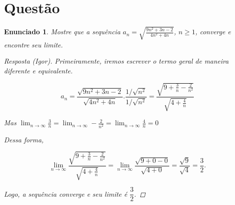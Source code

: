 \documentclass[a4paper,twoside,11pt]{article}
\newtheorem*{enunciado}{Enunciado}
\begin{document}
\section{Questão}
\begin{enunciado}
    Mostre que a sequência $a_n = \sqrt{\frac{9n^2 + 3n - 2}{4n^2+4n}}$, $n \geq 1$, converge e
    encontre seu limite.
    
    \begin{proof}[Resposta (Igor)]
        Primeiramente, iremos escrever o termo geral de maneira diferente e equivalente.

        $$a_n = \dfrac{\sqrt{9n^2+3n-2}}{\sqrt{4n^2+4n}}.\frac{1/\sqrt{n^2}}{1/\sqrt{n^2}}
        = \dfrac{\sqrt{9+\frac{3}{n}-\frac{2}{n^2}}}{\sqrt{4+\frac{4}{n}}}$$

        Mas
        $\lim_{n \rightarrow \infty}\frac{3}{n}
        = \lim_{n \rightarrow \infty}-\frac{2}{n^2}
        = \lim_{n \rightarrow \infty}\frac{4}{n} = 0$

        Dessa forma,
        
        $$\lim_{n \rightarrow \infty}
        \dfrac{\sqrt{9+\frac{3}{n}-\frac{2}{n^2}}}{\sqrt{4+\frac{4}{n}}}
        = \lim_{n \rightarrow \infty} \dfrac{\sqrt{9+0-0}}{\sqrt{4+0}} = \dfrac{\sqrt{9}}{\sqrt{4}} = \dfrac{3}{2}.$$
        
        Logo, a sequência converge e seu limite é $\dfrac{3}{2}$.
    \end{proof}
\end{enunciado}
\end{document}
